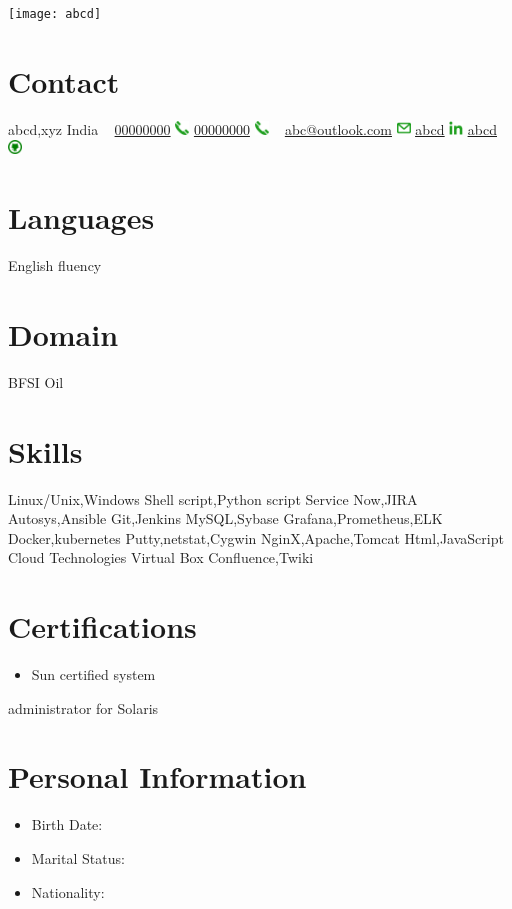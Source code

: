 \documentclass[]{cv-style} %
\begin{document}
\newcommand{\Iconemail}{\includegraphics[width=1em]{email.png}}
\newcommand{\Icontel}{\includegraphics[width=1em]{tel.png}}
\newcommand{\Iconlinkedin}{\includegraphics[width=1em]{linkedin.png}}
\newcommand{\Icongit}{\includegraphics[width=1em]{github.png}}
\begin{aside}
\texttt{[image: abcd]}
\section{Contact}
abcd,xyz 
India
~
\href{tel:+91 0000000}{00000000} \Icontel
\href{tel:+91 0000000}{00000000} \Icontel
~
\href{mailto:abc@outlook.com}{\underline{abc@outlook.com}} \Iconemail
\href{https://www.linkedin.com/in/abcd/}{\underline{abcd}} \Iconlinkedin 
\href{https://github.com/abcd}{\underline{abcd}} \Icongit 
\section{Languages}
English fluency
\section{Domain}
BFSI
Oil
\section{Skills}
Linux/Unix,Windows
Shell script,Python script
Service Now,JIRA
Autosys,Ansible
Git,Jenkins
MySQL,Sybase
Grafana,Prometheus,ELK
Docker,kubernetes
Putty,netstat,Cygwin
NginX,Apache,Tomcat
Html,JavaScript
Cloud Technologies
Virtual Box
Confluence,Twiki
\section{Certifications}
\begin{itemize}
\item Sun certified system 
\end{itemize}
          administrator for Solaris
\section{Personal Information}
\begin{itemize}
\item Birth Date: 
\item Marital Status: 
\item Nationality: 
\end{itemize}
\end{aside}
\end{document}
